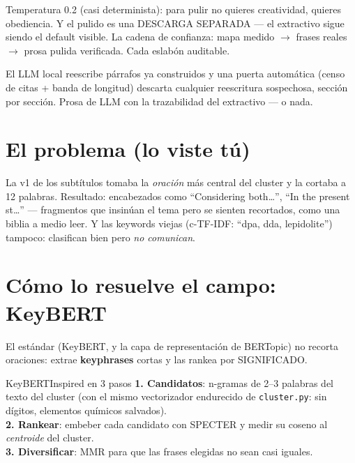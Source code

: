 \documentclass[11pt,a4paper]{article}
\begin{document}
\begin{ojo}
Temperatura 0.2 (casi determinista): para pulir no quieres creatividad, quieres
obediencia. Y el pulido es una DESCARGA SEPARADA --- el extractivo sigue siendo el
default visible. La cadena de confianza: mapa medido $\rightarrow$ frases reales
$\rightarrow$ prosa pulida verificada. Cada eslabón auditable.
\end{ojo}

\begin{resumen}
El LLM local reescribe párrafos ya construidos y una puerta automática (censo de citas +
banda de longitud) descarta cualquier reescritura sospechosa, sección por sección.
Prosa de LLM con la trazabilidad del extractivo — o nada.
\end{resumen}
\clearpage
{}
{}

\section{El problema (lo viste tú)}

La v1 de los subtítulos tomaba la \emph{oración} más central del cluster y la cortaba a
12 palabras. Resultado: encabezados como ``Considering both\ldots'', ``In the present
st\ldots'' --- fragmentos que insinúan el tema pero se sienten recortados, como una
biblia a medio leer. Y las keywords viejas (c-TF-IDF: ``dpa, dda, lepidolite'') tampoco:
clasifican bien pero \emph{no comunican}.

\section{Cómo lo resuelve el campo: KeyBERT}

El estándar (KeyBERT, y la capa de representación de BERTopic) no recorta oraciones:
extrae \textbf{keyphrases} cortas y las rankea por SIGNIFICADO.

\begin{concepto}{KeyBERTInspired en 3 pasos}
\textbf{1. Candidatos}: n-gramas de 2--3 palabras del texto del cluster (con el mismo
vectorizador endurecido de \texttt{cluster.py}: sin dígitos, elementos químicos
salvados). \\
\textbf{2. Rankear}: embeber cada candidato con SPECTER y medir su coseno al
\emph{centroide} del cluster. \\
\textbf{3. Diversificar}: MMR para que las frases elegidas no sean casi iguales.
\end{concepto}
\end{document}
